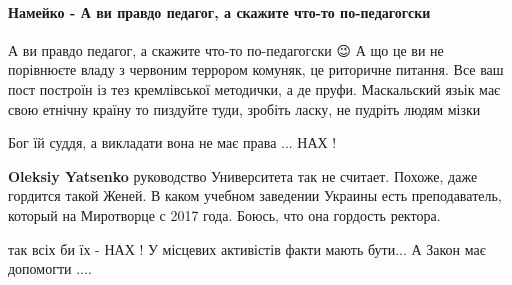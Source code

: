  
 
 
 
 
\paragraph{Намейко - А ви правдо педагог, а скажите что-то по-педагогски}
\label{sec:18_01_2021.fb.bilchenko_evgenia.1.mova_jazyk.cmt.namejko_pedagog}

\begin{itemize}


А ви правдо педагог, а скажите что-то по-педагогски 😉 А що це ви не порівнюєте
владу з червоним террором комуняк, це риторичне питання. Все ваш пост построїн
із тез кремлівської методички, а де пруфи. Маскальский язьік має свою етнічну
країну то пиздуйте туди, зробіть ласку, не пудріть людям мізки



Бог їй суддя, а викладати вона не має права ... НАХ !

\begin{itemize}

\textbf{Oleksiy Yatsenko} руководство Университета так не считает. Похоже, даже гордится такой Женей. В каком учебном заведении Украины есть преподаватель, который на Миротворце с 2017 года. Боюсь, что она гордость ректора.


так всіх би їх - НАХ ! У місцевих активістів факти мають бути... А Закон має допомогти ....



\end{itemize}
\end{itemize}

